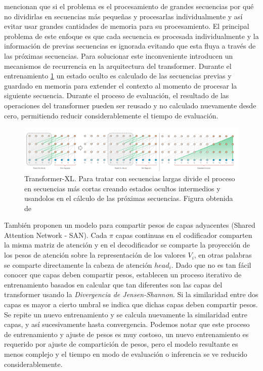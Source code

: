 \citeauthor*{DBLP:journals/corr/abs-1901-02860} mencionan que si el problema es el procesamiento de
grandes secuencias por qué no dividirlas en secuencias más pequeñas y procesarlas individualmente
y así evitar usar grandes cantidades de memoria para su procesamiento. El principal problema de este
enfoque es que cada secuencia es procesada individualmente y la información de previas secuencias es
ignorada evitando que esta fluya a través de las próximas secuencias. Para solucionar este
inconveniente introducen un mecanismos de recurrencia en la arquitectura del transformer. Durante el
entrenamiento \ref{fig:trans-xl} un estado oculto es calculado de las secuencias previas y guardado
en memoria para extender el contexto al momento de procesar la siguiente secuencia. Durante el
proceso de evaluación, el resultado de las operaciones del transformer pueden ser reusado y no
calculado nuevamente desde cero, permitiendo reducir considerablemente el tiempo de evaluación.

\begin{figure}[ht!]
    \centering
    \includegraphics[width=0.8 \textwidth]{Chapters/1. Transformer/Figures/transformer/trans-XL.png}
    \caption{Transformer-XL. Para tratar con secuencias largas divide el proceso en secuencias más
             cortas creando estados ocultos intermedios y usandolos en el cálculo de las próximas
             secuencias. Figura obtenida de \cite{DBLP:journals/corr/abs-1901-02860}}
    \label{fig:trans-xl}
\end{figure}

También \citeauthor{DBLP:journals/corr/abs-1906-11024} proponen un modelo para compartir pesos de capas
adyacentes (Shared Attention Network - SAN).
Cada $\pi$ capas continuas en el codificador comparten la misma matriz de atención y en el
decodificador se comparte la proyección de los pesos de atención sobre la representación de los
valores $V_i$, en otras palabras se comparte directamente la cabeza de atención $head_i$. Dado que no
es tan fácil conocer que capas deben compartir pesos, establecen un proceso iterativo
de entrenamiento basados en calcular que tan diferentes son las capas del transformer usando
la \textit{Divergencia de Jensen-Shannon}. Si la similaridad entre dos capas es mayor a cierto umbral
se indica que dichas capas deben compartir pesos. Se repite un nuevo entrenamiento y se calcula
nuevamente la similaridad entre capas, y así sucesivamente hasta convergencia. Podemos notar que este
proceso de entrenamiento y ajuste de pesos es muy costoso, un nuevo entrenamiento es requerido por
ajuste de compartición de pesos, pero el modelo resultante
es menos complejo y el tiempo en modo de evaluación o inferencia se ve reducido considerablemente.


